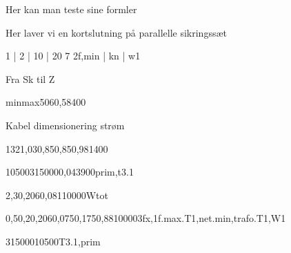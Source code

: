\documentclass[a4paper,oneside,10pt,danish]{report}
\begin{document}
Her kan man teste sine formler

 
 Her laver vi en kortslutning på parallelle sikringssæt
	\begin{LV-Ik2f,parSikr-kA}
		{ 1 | 2 | 10 | 20 }
		{7}
		{2f,min | kn | w1}
	\end{LV-Ik2f,parSikr-kA} 
 
 
 
 
 
 
 
 
 
 
 
 
 
 
 
 
 
 
 
 
Fra Sk til Z
\begin{FraSkTilZ}{min}{max}{50}{6}{0,58}{400}
\end{FraSkTilZ}

Kabel dimensionering strøm
\begin{Iz,min}{132}{1,03}{0,85}{0,85}{0,98}{1}{400}
\end{Iz,min}

\begin{Ztrafo}{10500}{315000}{0,04}{3900}{prim,t3.1}
\end{Ztrafo}

\begin{Zkabel}{2,3}{0,206}{0,081}{10000}{Wtot}
\end{Zkabel}


\begin{ZtilIkHV}{0,5}{0,2}{0,206}{0,075}{0,175}{0,88}{10000}{3fx,1f.max.T1,net.min,trafo.T1,W1}
\end{ZtilIkHV}


\begin{TrafoFuldlast}{315000}{10500}{T3.1,prim}
\end{TrafoFuldlast}
\end{document}
